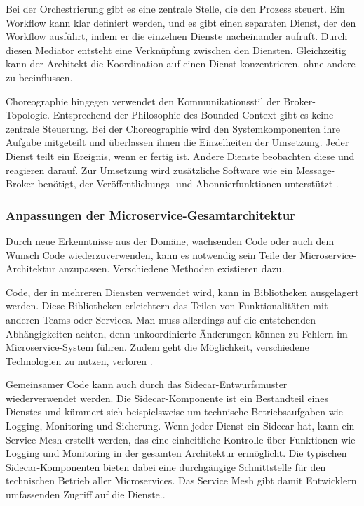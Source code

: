 {Bei der Orchestrierung gibt es eine zentrale Stelle, die den Prozess steuert. Ein Workflow kann klar definiert werden, und es gibt einen separaten Dienst, der den Workflow ausführt, indem er die einzelnen Dienste nacheinander aufruft. Durch diesen Mediator entsteht eine Verknüpfung zwischen den Diensten. Gleichzeitig kann der Architekt die Koordination auf einen Dienst konzentrieren, ohne andere zu beeinflussen.

Choreographie hingegen verwendet den Kommunikationsstil der Broker-Topologie. Entsprechend der Philosophie des Bounded Context gibt es keine zentrale Steuerung. Bei der Choreographie wird den Systemkomponenten ihre Aufgabe mitgeteilt und überlassen ihnen die Einzelheiten der Umsetzung. Jeder Dienst teilt ein Ereignis, wenn er fertig ist. Andere Dienste beobachten diese und reagieren darauf. Zur Umsetzung wird zusätzliche Software wie ein Message-Broker benötigt, der Veröffentlichungs- und Abonnierfunktionen unterstützt \cite[S.72]{newman} \cite[S.261-262,264-265]{richards} \cite[S.168-169]{sommerville}.

\subsubsection{Anpassungen der Microservice-Gesamtarchitektur}

Durch neue Erkenntnisse aus der Domäne, wachsenden Code oder auch dem Wunsch Code wiederzuverwenden, kann es notwendig sein Teile der Microservice-Architektur anzupassen. Verschiedene Methoden existieren dazu.

Code, der in mehreren Diensten verwendet wird, kann in Bibliotheken ausgelagert werden. Diese Bibliotheken erleichtern das Teilen von Funktionalitäten mit anderen Teams oder Services. Man muss allerdings auf die entstehenden Abhängigkeiten achten, denn unkoordinierte Änderungen können zu Fehlern im Microservice-System führen. Zudem geht die Möglichkeit, verschiedene Technologien zu nutzen, verloren \cite[S. 1121-115]{wolff} \cite[S.31]{newman}.

Gemeinsamer Code kann auch durch das Sidecar-Entwurfsmuster wiederverwendet werden. Die Sidecar-Komponente ist ein Bestandteil eines Dienstes und kümmert sich beispielsweise um technische Betriebsaufgaben wie Logging, Monitoring und Sicherung. Wenn jeder Dienst ein Sidecar hat, kann ein Service Mesh erstellt werden, das eine einheitliche Kontrolle über Funktionen wie Logging und Monitoring in der gesamten Architektur ermöglicht. Die typischen Sidecar-Komponenten bieten dabei eine durchgängige Schnittstelle für den technischen Betrieb aller Microservices. Das Service Mesh gibt damit Entwicklern umfassenden Zugriff auf die Dienste.\cite[S.256-258]{richards}.

}
